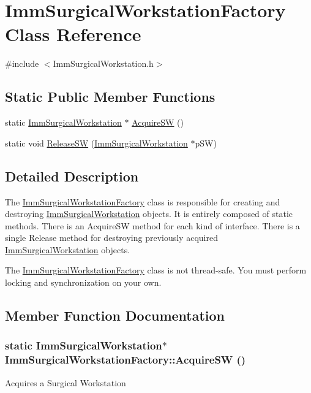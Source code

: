 \hypertarget{classImmSurgicalWorkstationFactory}{
\section{ImmSurgicalWorkstationFactory Class Reference}
\label{classImmSurgicalWorkstationFactory}
}


{\ttfamily \#include $<$ImmSurgicalWorkstation.h$>$}\subsection*{Static Public Member Functions}
\begin{DoxyCompactItemize}
\item 
static \hyperlink{classImmSurgicalWorkstation}{ImmSurgicalWorkstation} $\ast$ \hyperlink{classImmSurgicalWorkstationFactory_a9af1521e1dd6f60c427999d70caf606e}{AcquireSW} ()
\item 
static void \hyperlink{classImmSurgicalWorkstationFactory_aea3cddc144fe3f15f5518f6f9f234209}{ReleaseSW} (\hyperlink{classImmSurgicalWorkstation}{ImmSurgicalWorkstation} $\ast$pSW)
\end{DoxyCompactItemize}


\subsection{Detailed Description}
The \hyperlink{classImmSurgicalWorkstationFactory}{ImmSurgicalWorkstationFactory} class is responsible for creating and destroying \hyperlink{classImmSurgicalWorkstation}{ImmSurgicalWorkstation} objects. It is entirely composed of static methods. There is an AcquireSW method for each kind of interface. There is a single Release method for destroying previously acquired \hyperlink{classImmSurgicalWorkstation}{ImmSurgicalWorkstation} objects.

The \hyperlink{classImmSurgicalWorkstationFactory}{ImmSurgicalWorkstationFactory} class is not thread-\/safe. You must perform locking and synchronization on your own. 

\subsection{Member Function Documentation}
\hypertarget{classImmSurgicalWorkstationFactory_a9af1521e1dd6f60c427999d70caf606e}{
\subsubsection[{AcquireSW}]{\setlength{\rightskip}{0pt plus 5cm}static {\bf ImmSurgicalWorkstation}$\ast$ ImmSurgicalWorkstationFactory::AcquireSW ()}}
\label{classImmSurgicalWorkstationFactory_a9af1521e1dd6f60c427999d70caf606e}
Acquires a Surgical Workstation

